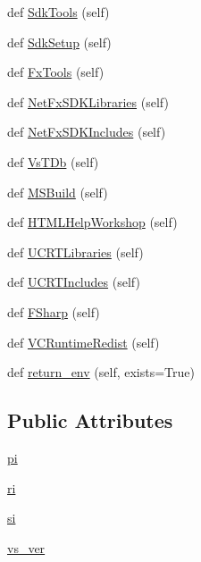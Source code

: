 \begin{DoxyCompactItemize}
\item 
def \hyperlink{classsetuptools_1_1msvc_1_1EnvironmentInfo_acb23a9749e0fe111972811bf363d4d06}{Sdk\+Tools} (self)
\item 
def \hyperlink{classsetuptools_1_1msvc_1_1EnvironmentInfo_a23279a1ba0a25df393ca46bbf6385936}{Sdk\+Setup} (self)
\item 
def \hyperlink{classsetuptools_1_1msvc_1_1EnvironmentInfo_ae4038292b85b81482ab5bfb95c2dd592}{Fx\+Tools} (self)
\item 
def \hyperlink{classsetuptools_1_1msvc_1_1EnvironmentInfo_a77f053b74ebe8fb0a3665de920a6243f}{Net\+Fx\+S\+D\+K\+Libraries} (self)
\item 
def \hyperlink{classsetuptools_1_1msvc_1_1EnvironmentInfo_ab13ca2d11d800439d2455f73d4a72c2e}{Net\+Fx\+S\+D\+K\+Includes} (self)
\item 
def \hyperlink{classsetuptools_1_1msvc_1_1EnvironmentInfo_a028eec8868bc5260636919e7765abe0b}{Vs\+T\+Db} (self)
\item 
def \hyperlink{classsetuptools_1_1msvc_1_1EnvironmentInfo_a755a19d899509a948701311bcdd6a705}{M\+S\+Build} (self)
\item 
def \hyperlink{classsetuptools_1_1msvc_1_1EnvironmentInfo_a30dfd7226487fa81a4e40f3824f67d63}{H\+T\+M\+L\+Help\+Workshop} (self)
\item 
def \hyperlink{classsetuptools_1_1msvc_1_1EnvironmentInfo_ad99df919a8c42c34654259bf96816981}{U\+C\+R\+T\+Libraries} (self)
\item 
def \hyperlink{classsetuptools_1_1msvc_1_1EnvironmentInfo_ae8cddbeb1c6a6d60edc6e46104ef30d0}{U\+C\+R\+T\+Includes} (self)
\item 
def \hyperlink{classsetuptools_1_1msvc_1_1EnvironmentInfo_a95f7df78e6bc6122e224e05888e98292}{F\+Sharp} (self)
\item 
def \hyperlink{classsetuptools_1_1msvc_1_1EnvironmentInfo_a2ad0b92bc587a134b6eddb0b970df495}{V\+C\+Runtime\+Redist} (self)
\item 
def \hyperlink{classsetuptools_1_1msvc_1_1EnvironmentInfo_ae97fea563dbce172645b20d5d151ef1a}{return\+\_\+env} (self, exists=True)
\end{DoxyCompactItemize}
\subsection*{Public Attributes}
\begin{DoxyCompactItemize}
\item 
\hyperlink{classsetuptools_1_1msvc_1_1EnvironmentInfo_a294a783bc00731fdced426bef20d6495}{pi}
\item 
\hyperlink{classsetuptools_1_1msvc_1_1EnvironmentInfo_adc41302e90a01ed9cd6a113758e4fd8c}{ri}
\item 
\hyperlink{classsetuptools_1_1msvc_1_1EnvironmentInfo_a37bf9db379b15b1915ce7a598b9c4c48}{si}
\item 
\hyperlink{classsetuptools_1_1msvc_1_1EnvironmentInfo_a276f799ad2ae0e6743413a1a55f3ade4}{vs\+\_\+ver}
\end{DoxyCompactItemize}


